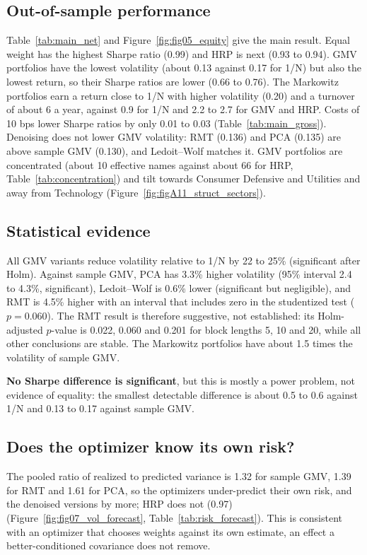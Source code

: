 \documentclass[11pt,a4paper]{article}
\begin{document}
\subsection{Out-of-sample performance}

Table~\ref{tab:main_net} and Figure~\ref{fig:fig05_equity} give the main result. Equal weight has the highest
Sharpe ratio (0.99) and HRP is next (0.93 to 0.94). GMV portfolios have the lowest volatility (about 0.13
against 0.17 for 1/N) but also the lowest return, so their Sharpe ratios are lower (0.66 to 0.76). The Markowitz
portfolios earn a return close to 1/N with higher volatility (0.20) and a turnover of about 6 a year, against 0.9 for 1/N and 2.2 to 2.7 for GMV and HRP. Costs of 10 bps lower Sharpe ratios by only
0.01 to 0.03 (Table~\ref{tab:main_gross}). Denoising does not lower GMV volatility: RMT (0.136) and PCA (0.135)
are above sample GMV (0.130), and Ledoit--Wolf matches it. GMV portfolios are concentrated (about 10 effective
names against about 66 for HRP, Table~\ref{tab:concentration}) and tilt towards Consumer Defensive and Utilities
and away from Technology (Figure~\ref{fig:figA11_struct_sectors}).

\subsection{Statistical evidence}

All GMV variants reduce volatility relative to 1/N by 22 to 25\% (significant after Holm). Against sample GMV, PCA
has 3.3\% higher volatility (95\% interval 2.4 to 4.3\%, significant), Ledoit--Wolf is 0.6\% lower (significant but
negligible), and RMT is 4.5\% higher with an interval that includes zero in the studentized test ($p=0.060$). The
RMT result is therefore suggestive, not established: its Holm-adjusted $p$-value is 0.022, 0.060 and 0.201 for block
lengths 5, 10 and 20, while all other conclusions are stable. The Markowitz portfolios have about 1.5 times the
volatility of sample GMV.

\textbf{No Sharpe difference is significant}, but this is mostly a power problem, not evidence of equality: the
smallest detectable difference is about 0.5 to 0.6 against 1/N and 0.13 to 0.17 against sample GMV.
\subsection{Does the optimizer know its own risk?}

The pooled ratio of realized to predicted variance is 1.32 for sample GMV, 1.39 for RMT and 1.61 for PCA, so the
optimizers under-predict their own risk, and the denoised versions by more; HRP does not (0.97)
(Figure~\ref{fig:fig07_vol_forecast}, Table~\ref{tab:risk_forecast}). This is consistent with an optimizer that
chooses weights against its own estimate, an effect a better-conditioned covariance does not remove.
\end{document}
